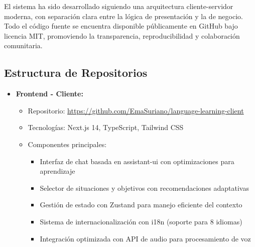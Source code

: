 El sistema ha sido desarrollado siguiendo una arquitectura cliente-servidor moderna, con separación clara entre la lógica de presentación y la de negocio. Todo el código fuente se encuentra disponible públicamente en GitHub bajo licencia MIT, promoviendo la transparencia, reproducibilidad y colaboración comunitaria.

\subsection{Estructura de Repositorios}
\label{subsec:estructura-repositorios}

\begin{itemize}
    \item \textbf{Frontend - Cliente:}
    \begin{itemize}
        \item Repositorio: \url{https://github.com/EmaSuriano/language-learning-client}
        \item Tecnologías: Next.js 14, TypeScript, Tailwind CSS
        \item Componentes principales:
              \begin{itemize}
                  \item Interfaz de chat basada en \gls{assistant-ui} con optimizaciones para aprendizaje
                  \item Selector de situaciones y objetivos con recomendaciones adaptativas
                  \item Gestión de estado con Zustand para manejo eficiente del contexto
                  \item Sistema de internacionalización con i18n (soporte para 8 idiomas)
                  \item Integración optimizada con API de audio para procesamiento de voz
              \end{itemize}
    \end{itemize}


\end{itemize}

